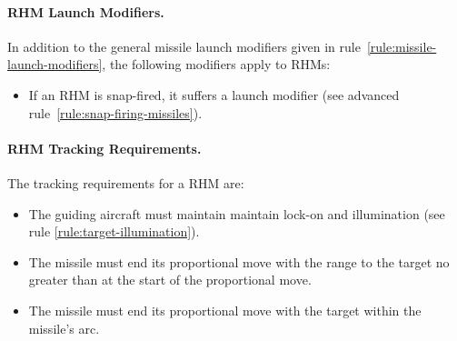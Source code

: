 {\paragraph{RHM Launch Modifiers.}
\label{rule:rhm-launch-modifiers}

In addition to the general missile launch modifiers given in rule~\ref{rule:missile-launch-modifiers}, the following modifiers apply to RHMs:

\begin{itemize}
    \item If an RHM is snap-fired, it suffers a  launch modifier (see advanced rule~\ref{rule:snap-firing-missiles}).
\end{itemize}

\paragraph{RHM Tracking Requirements.} 
\label{rule:rhm-tracking-requirements}

The tracking requirements for a RHM are:

\begin{itemize}

    \item The guiding aircraft must maintain maintain lock-on and illumination (see rule \ref{rule:target-illumination}).

    \item The missile must end its proportional move with the range to the target no greater than at the start of the proportional move.

    \item The missile must end its proportional move with the target within the missile's  arc.

\end{itemize}

}

